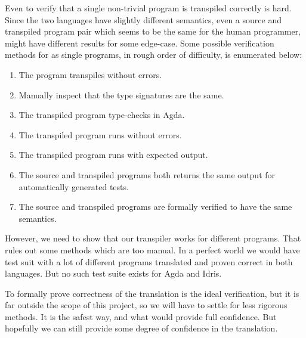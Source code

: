 Even to verify that a single non-trivial program is transpiled correctly is
hard. Since the two languages have slightly different semantics, even a source
and transpiled program pair which seems to be the same for the human
programmer, might have different results for some edge-case. Some possible
verification methods for as single programs, in rough order of difficulty, is
enumerated below:

\begin{enumerate}
\item The program transpiles without errors.
\item Manually inspect that the type signatures are the same.
\item The transpiled program type-checks in Agda.
\item The transpiled program runs without errors.
\item The transpiled program runs with expected output.
\item The source and transpiled programs both returns the same output for
  automatically generated tests.
\item The source and transpiled programs are formally verified to have the same
  semantics.
\end{enumerate}

\todo{ TODO Beskriv att den har listan ar lite naiv. Att det finns m[nga stege
mellan varje steg. }


However, we need to show that our transpiler works for different programs.
That rules out some methods which are too manual.  In a perfect world we would
have test suit with a lot of different programs translated and proven correct in
both languages. But no such test suite exists for Agda and Idris.


To formally prove correctness of the translation is the ideal verification, but
it is far outside the scope of this project, so we will have to settle for less
rigorous methods. It is the safest way, and what would provide full confidence.
But hopefully we can still provide some degree of confidence in the
translation.





